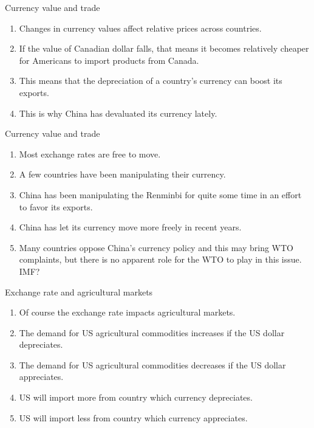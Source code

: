 \documentclass[table,xcolor=pdftex,dvipsnames]{beamer}\usepackage[]{graphicx}\usepackage[]{color}
\begin{document}

\begin{frame}{Currency value and trade}
\begin{enumerate}[label=\textbullet]
    \item Changes in currency values affect relative prices across countries.
    \item If the value of Canadian dollar falls, that means it becomes relatively cheaper for Americans to import products from Canada.
    \item This means that the depreciation of a country's currency can boost its exports.
    \item This is why China has devaluated its currency lately.
\end{enumerate}
\end{frame}


\begin{frame}{Currency value and trade}
\begin{enumerate}[label=\textbullet]
    \item Most exchange rates are free to move.
    \item A few countries have been manipulating their currency.
    \item China has been manipulating the Renminbi for quite some time in an effort to favor its exports.
    \item China has let its currency move more freely in recent years.
    \item Many countries oppose China's currency policy and this may bring WTO complaints, but there is no apparent role for the WTO to play in this issue. IMF?
\end{enumerate}
\end{frame}



\begin{frame}{Exchange rate and agricultural markets}
\begin{enumerate}[label=\textbullet]
    \item Of course the exchange rate impacts agricultural markets.
    \item The demand for US agricultural commodities increases if the US dollar depreciates.
    \item The demand for US agricultural commodities decreases if the US dollar appreciates.
    \item US will import more from country which currency depreciates.
    \item US will import less from country which currency appreciates.
\end{enumerate}
\end{frame}
\end{document}
